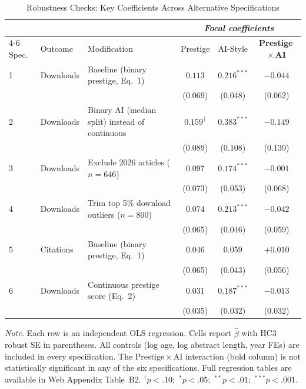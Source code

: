 \documentclass[12pt,a4paper]{article}
\begin{document}
\begin{table}[htbp]
\centering
\caption{Robustness Checks: Key Coefficients Across Alternative Specifications}
\label{tab:robustness}
\begin{threeparttable}
\small
\begin{tabular}{lllccc}
\toprule
 & & & \multicolumn{3}{c}{\textit{Focal coefficients}} \\
\cmidrule(lr){4-6}
Spec. & Outcome & Modification
  & Prestige & AI-Style & \textbf{Prestige\,$\times$\,AI} \\
\midrule
1 & Downloads & Baseline (binary prestige, Eq.~1)
  & $0.113$ & $0.216^{***}$  & $-0.044$ \\
  &           &
  & (0.069) & (0.048)        & (0.062)  \\[4pt]
2 & Downloads & Binary AI (median split) instead of continuous
  & $0.159^{\dagger}$ & $0.383^{***}$ & $-0.149$  \\
  &           &
  & (0.089)           & (0.108)       & (0.139)  \\[4pt]
3 & Downloads & Exclude 2026 articles ($n = 646$)
  & $0.097$ & $0.174^{***}$  & $-0.001$ \\
  &           &
  & (0.073) & (0.053)        & (0.068)  \\[4pt]
4 & Downloads & Trim top 5\% download outliers ($n=800$)
  & $0.074$ & $0.213^{***}$  & $-0.042$ \\
  &           &
  & (0.065) & (0.046)        & (0.059)  \\[4pt]
5 & Citations & Baseline (binary prestige, Eq.~1)
  & $0.046$  & $0.059$  & $+0.010$ \\
  &           &
  & (0.065)  & (0.043)  & (0.056)  \\[4pt]
6 & Downloads & Continuous prestige score (Eq.~2)
  & $0.031$ & $0.187^{***}$ & $-0.013$ \\
  &           &
  & (0.035) & (0.032)       & (0.032)  \\[4pt]
\bottomrule
\end{tabular}
\begin{tablenotes}
\footnotesize
\item \textit{Note.} Each row is an independent OLS regression.
  Cells report $\hat{\beta}$ with HC3 robust SE in parentheses.
  All controls (log age, log abstract length, year FEs)
  are included in every specification.
  The Prestige\,$\times$\,AI interaction (bold column) is not statistically
  significant in any of the six specifications.
  Full regression tables are available in Web Appendix Table~B2.
  $^{\dagger}p<.10$;\ $^{*}p<.05$;\ $^{**}p<.01$;\ $^{***}p<.001$.
\end{tablenotes}
\end{threeparttable}
\end{table}
\end{document}
